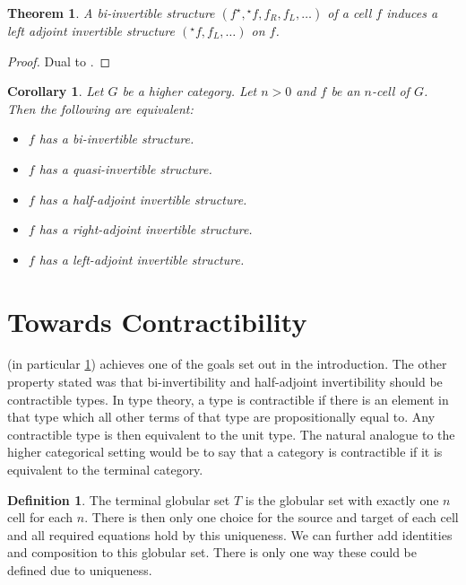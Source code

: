 \documentclass{article}
\newtheorem{theorem}{Theorem}
\newtheorem{cor}{Corollary}
\theoremstyle{definition}
\newtheorem{definition}{Definition}
\theoremstyle{remark}
\newcommand{\linv}[1]{{}^\star\!#1}
\newcommand{\rinv}[1]{#1^\star}
\begin{document}
\begin{theorem}
  A bi-invertible structure \((\rinv f, \linv f, f_R, f_L, \dots)\) of a cell \(f\) induces a left adjoint invertible structure \((\linv f, f_L, \dots)\) on \(f\).
\end{theorem}
\begin{proof}
  Dual to .
\end{proof}

\begin{cor}\label{cor:equiv}
  Let \(G\) be a higher category. Let \(n > 0\) and \(f\) be an \(n\)-cell of \(G\). Then the following are equivalent:
  \begin{itemize}
  \item \(f\) has a bi-invertible structure.
  \item \(f\) has a quasi-invertible structure.
  \item \(f\) has a half-adjoint invertible structure.
  \item \(f\) has a right-adjoint invertible structure.
  \item \(f\) has a left-adjoint invertible structure.
  \end{itemize}
\end{cor}

\section{Towards Contractibility}\label{sec:contractibility}

 (in particular \cref{cor:equiv}) achieves one of the goals set out in the introduction. The other property stated was that bi-invertibility and half-adjoint invertibility should be contractible types. In type theory, a type is contractible if there is an element in that type which all other terms of that type are propositionally equal to. Any contractible type is then equivalent to the unit type. The natural analogue to the higher categorical setting would be to say that a category is contractible if it is equivalent to the terminal category.

\begin{definition}
  The terminal globular set \(T\) is the globular set with exactly one \(n\) cell for each \(n\). There is then only one choice for the source and target of each cell and all required equations hold by this uniqueness.
  We can further add identities and composition to this globular set. There is only one way these could be defined due to uniqueness.
\end{definition}
\end{document}
